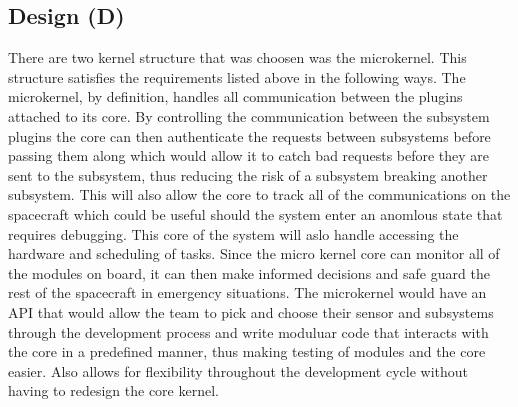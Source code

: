 \documentclass[12pt]{article}
\begin{document}
        \subsection{Design (D)}
        There are two kernel structure that was choosen was the microkernel. This structure satisfies the requirements listed above
        in the following ways. The microkernel, by definition, handles all communication between the plugins attached to its core. 
        By controlling the communication between the subsystem plugins the core can then authenticate the requests between subsystems
        before passing them along which would allow it to catch bad requests before they are sent to the subsystem, thus reducing the 
        risk of a subsystem breaking another subsystem. This will also allow the core to track all of the communications on the spacecraft
        which could be useful should the system enter an anomlous state that requires debugging. This core of the system will aslo handle 
        accessing the hardware and scheduling of tasks. Since the micro kernel core can monitor all of the modules on board, it can then 
        make informed decisions and safe guard the rest of the spacecraft in emergency situations. The microkernel would have an API that
        would allow the team to pick and choose their sensor and subsystems through the development process and write moduluar code that
        interacts with the core in a predefined manner, thus making testing of modules and the core easier. Also allows for flexibility
        throughout the development cycle without having to redesign the core kernel. \\
        \\

\end{document}
